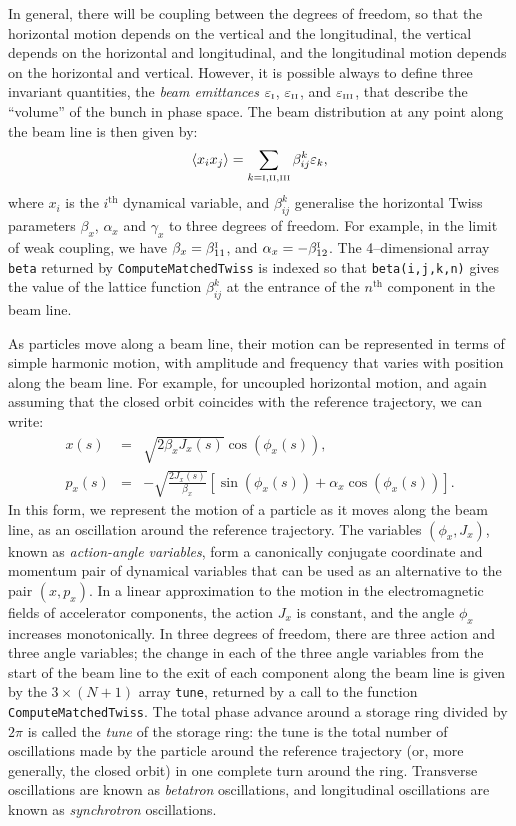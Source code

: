 \documentclass[11pt,twoside,a4paper]{article}
\begin{document}
In general, there will be coupling between the degrees of freedom, so that the
horizontal motion depends on the vertical and the longitudinal, the vertical
depends on the horizontal and longitudinal, and the longitudinal motion depends
on the horizontal and vertical.  However, it is possible always to define
three invariant quantities, the \emph{beam emittances} $\varepsilon_\textrm{\tiny I}$,
$\varepsilon_\textrm{\tiny II}$, and $\varepsilon_\textrm{\tiny III}$, that describe the
``volume'' of the bunch in phase space.  The beam distribution at any point along
the beam line is then given by:
\[
\langle x_i x_j \rangle = \sum_{k=\textrm{\tiny I},\textrm{\tiny II},\textrm{\tiny III}}
\beta_{ij}^k \varepsilon_k,
\]
where $x_i$ is the $i^\textrm{th}$ dynamical variable, and $\beta_{ij}^k$ generalise
the horizontal Twiss parameters $\beta_x$, $\alpha_x$ and $\gamma_x$ to three
degrees of freedom.  For example, in the limit of weak coupling, we have
$\beta_x = \beta_{11}^\textrm{\tiny I}$, and $\alpha_x =-\beta_{12}^\textrm{\tiny I}$.
The 4--dimensional array \texttt{beta} returned by
\texttt{ComputeMatchedTwiss} is indexed so that \texttt{beta(i,j,k,n)} gives the
value of the lattice function $\beta_{ij}^k$ at the entrance of the $n^\textrm{th}$
component in the beam line.

As particles move along a beam line, their motion can be represented in terms of
simple harmonic motion, with amplitude and frequency that varies with position
along the beam line.  For example, for uncoupled horizontal motion, and again assuming
that the closed orbit coincides with the reference trajectory, we can write:
\begin{eqnarray*}
x(s) & = & \sqrt{2\beta_x J_x(s)} \cos \left( \phi_x(s) \right), \\
p_x(s) & = & -\sqrt{\frac{2J_x(s)}{\beta_x}} \left[ \sin \left( \phi_x(s) \right)  + 
                                           \alpha_x \cos \left( \phi_x(s) \right) \right].
\end{eqnarray*}
In this form, we represent the motion of a particle as it moves along the beam
line, as an oscillation around the reference trajectory.
The variables $(\phi_x,J_x)$, known as \emph{action-angle variables}, form
a canonically conjugate coordinate and momentum pair of dynamical variables that
can be used as an alternative to the pair $(x,p_x)$.  In a linear approximation
to the motion in the electromagnetic fields of accelerator components, the action $J_x$
is constant, and the angle $\phi_x$ increases monotonically.  In three degrees of
freedom, there are three action and three angle variables; the change in each of
the three angle variables from the start of the beam line to the exit of each
component along the beam line is given by the $3\times (N+1)$ array \texttt{tune},
returned by a call to the function \texttt{ComputeMatchedTwiss}.  The total phase
advance around a storage ring divided by $2\pi$ is called the \emph{tune} of the
storage ring: the tune is the total number of oscillations made by the particle
around the reference trajectory (or, more generally, the closed orbit) in one
complete turn around the ring.  Transverse oscillations are known as \emph{betatron}
oscillations, and longitudinal oscillations are known as \emph{synchrotron}
oscillations.
\end{document}
